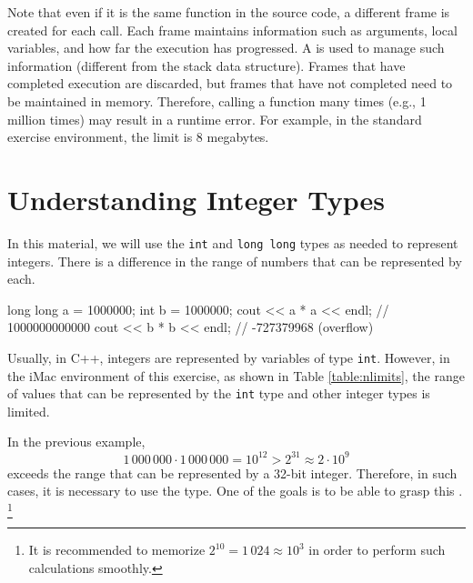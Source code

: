 Note that even if it is the same function in the source code, a different frame is created for each call.
Each frame maintains information such as arguments, local variables, and how far the execution has progressed.
A  is used to manage such information (different from the stack data structure).
Frames that have completed execution are discarded, but frames that have not completed need to be maintained in memory. Therefore, calling a function many times (e.g., 1 million times) may result in a runtime error. For example, in the standard exercise environment, the limit is 8 megabytes. 
\section{Understanding Integer Types}\label{section:long-long}

In this material, we will use the \texttt{int} and \texttt{long long} types as needed to represent integers. There is a difference in the range of numbers that can be represented by each.

\begin{cbox}
    long long a = 1000000;
    int b = 1000000;
    cout << a * a << endl; // 1000000000000
    cout << b * b << endl; // -727379968 (overflow)
\end{cbox}

Usually, in C++, integers are represented by variables of type \texttt{int}. However, in the iMac environment of this exercise, as shown in Table \ref{table:nlimits}, the range of values that can be represented by the \texttt{int} type and other integer types is limited.

In the previous example,
$$1\,000\,000 \cdot 1\,000\,000 = 10^{12} > 2^{31} \approx 2\cdot10^{9}$$
exceeds the range that can be represented by a 32-bit integer.
Therefore, in such cases, it is necessary to use the  type. One of the goals is to be able to grasp this . \footnote{It is recommended to memorize $2^{10}=1\,024\approx10^3$ in order to perform such calculations smoothly.}

